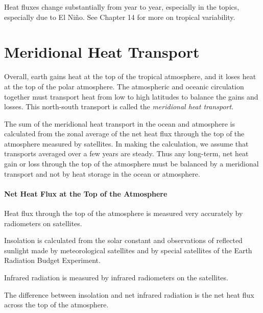 Heat fluxes change substantially from year to year, especially in the topics, especially due to El Ni\~{n}o. See Chapter 14 for more on tropical variability.

\section{Meridional Heat Transport}
 Overall, earth gains heat at the top
of the tropical atmosphere, and it loses heat at the top of the polar atmosphere. The
atmospheric and oceanic circulation together must transport heat from low to high latitudes to
balance the gains and losses. This north-south transport is called the \textit{meridional heat
transport}.

The sum of the meridional heat transport in the ocean and atmosphere is
calculated from the zonal average of the net heat flux through the top of the atmosphere measured by satellites. In making the
calculation, we assume that transports averaged over a few years are steady. Thus any
long-term, net heat gain or loss through the top of the atmosphere must be balanced by a
meridional transport and not by heat storage in the ocean or atmosphere.

\paragraph{Net Heat Flux at the Top of the Atmosphere}
Heat flux through
the top of the atmosphere is measured very accurately by radiometers on satellites.
\begin{enumerate}

\vitem
Insolation is calculated from the solar constant and
observations of reflected sunlight made by meteorological satellites and by
special satellites of the Earth Radiation Budget Experiment.

\vitem
Infrared radiation is measured by infrared radiometers on the satellites.

\vitem
The difference between insolation and net infrared
radiation is the net heat flux across the
top of the atmosphere.
\end{enumerate}

